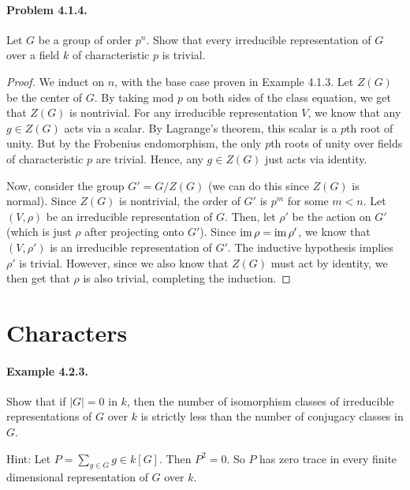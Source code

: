 \documentclass[oneside]{scrbook}
\begin{document}
\paragraph{Problem 4.1.4.} Let $G$ be a group of order $p^n$. Show that every
irreducible representation of $G$ over a field $k$ of characteristic $p$ is
trivial.
\begin{proof}
We induct on $n$, with the base case proven in Example 4.1.3. Let $Z(G)$ be the center of $G$. By taking mod $p$ on both sides of the class equation, we get that $Z(G)$ is nontrivial. For any irreducible representation $V$, we know that any $g\in Z(G)$ acts via a scalar. By Lagrange's theorem, this scalar is a $p$th root of unity. But by the Frobenius endomorphism, the only $p$th roots of unity over fields of characteristic $p$ are trivial. Hence, any $g\in Z(G)$ just acts via identity.

Now, consider the group $G'=G/Z(G)$ (we can do this since $Z(G)$ is normal). Since $Z(G)$ is nontrivial, the order of $G'$ is $p^m$ for some $m<n$. Let $(V,\rho)$ be an irreducible representation of $G$. Then, let $\rho'$ be the action on $G'$ (which is just $\rho$ after projecting onto $G'$). Since $\operatorname{im} \rho=\operatorname{im} \rho'$, we know that $(V,\rho')$ is an irreducible representation of $G'$. The inductive hypothesis implies $\rho'$ is trivial. However, since we also know that $Z(G)$ must act by identity, we then get that $\rho$ is also trivial, completing the induction.
\end{proof}

\section{Characters}

\paragraph{Example 4.2.3.} Show that if $|G|=0$ in $k$, then the number of isomorphism classes of irreducible representations of $G$ over $k$ is strictly less than the number of conjugacy classes in $G$.

Hint: Let $P=\sum_{g\in G}g\in k[G]$. Then $P^2=0$. So $P$ has zero trace in every finite dimensional representation of $G$ over $k$.
\end{document}
